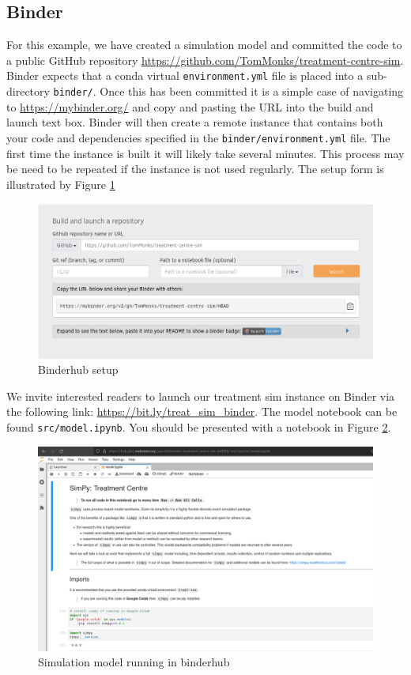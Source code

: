 \documentclass{swpaperproc}
\theoremstyle{sw}
\begin{document}
\subsection{Binder}

For this example, we have created a simulation model and committed the code to a public GitHub repository \url{https://github.com/TomMonks/treatment-centre-sim}.  Binder expects that a conda virtual \verb|environment.yml| file is placed into a sub-directory \verb|binder/|. Once this has been committed it is a simple case of navigating to \url{https://mybinder.org/} and copy and pasting the URL into the build and launch text box. Binder will then create a remote instance that contains both your code and dependencies specified in the \verb|binder/environment.yml| file.  The first time the instance is built it will likely take several minutes.  This process may be need to be repeated if the instance is not used regularly.  The setup form is illustrated by Figure \ref{fig:biunder}

\begin{figure}[ht]
\centering
\includegraphics[scale=0.3]{binder_example.png}
\caption{Binderhub setup}
\label{fig:biunder}
\end{figure}

We invite interested readers to launch our treatment sim instance on Binder via the following link: \url{https://bit.ly/treat_sim_binder}.  The model notebook can be found \verb|src/model.ipynb|.  You should be presented with a notebook in Figure \ref{fig:jupyter}.

\begin{figure}[ht]
\centering
\includegraphics[scale=0.20]{jupyter.png}
\caption{Simulation model running in binderhub}
\label{fig:jupyter}
\end{figure}
\end{document}

